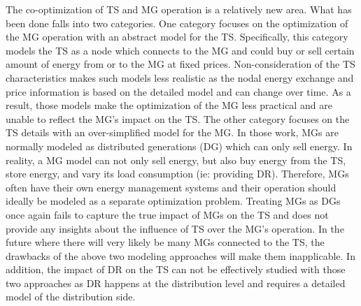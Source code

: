 The co-optimization of TS and MG operation is a relatively new area. What has been done falls into two categories. One category \cite{optimals,ref5,a,model,optimizing,population,risk,RTP2} focuses on the optimization of the MG operation with an abstract model for the TS. Specifically, this category models the TS as a node which connects to the MG and could buy or sell certain amount of energy from or to the MG at fixed prices. Non-consideration of the TS characteristics makes such models less realistic as the nodal energy exchange and price information is based on the detailed model and can change over time. As a result, those models make the optimization of the MG less practical and are unable to reflect the MG's impact on the TS. The other category \cite{CBA, CF, PSO,graph,lmprank, sto, sa, solar} focuses on the TS details with an over-simplified model for the MG. In those work, MGs are normally modeled as distributed generations (DG) which can only sell energy. In reality, a MG model can not only sell energy, but also buy energy from the TS, store energy, and vary its load consumption (ie: providing DR). Therefore, MGs often have their own energy management systems and their operation should ideally be modeled as a separate optimization problem. Treating MGs as DGs once again fails to capture the true impact of MGs on the TS and does not provide any insights about the influence of TS over the MG's operation. In the future where there will very likely be many MGs connected to the TS, the drawbacks of the above two modeling approaches will make them inapplicable. In addition, the impact of DR on the TS can not be effectively studied with those two approaches as DR happens at the distribution level and requires a detailed model of the distribution side. 

